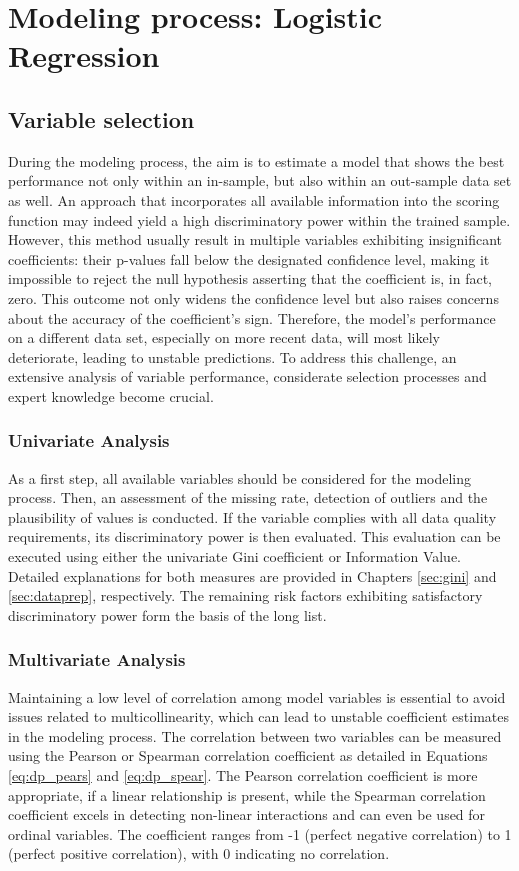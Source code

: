 \section{Modeling process: Logistic Regression}

\subsection{Variable selection}
During the modeling process, the aim is to estimate a model that shows the best performance not only within an in-sample, but also within an out-sample data set as well. An approach that incorporates all available information into the scoring function may indeed yield a high discriminatory power within the trained sample. However, this method usually result in multiple variables exhibiting insignificant coefficients: their p-values fall below the designated confidence level, making it impossible to reject the null hypothesis asserting that the coefficient is, in fact, zero. This outcome not only widens the confidence level but also raises concerns about the accuracy of the coefficient's sign. Therefore, the model's performance on a different data set, especially on more recent data, will most likely deteriorate, leading to unstable predictions. To address this challenge, an extensive analysis of variable performance, considerate selection processes and expert knowledge become crucial. \cite[p.~44]{Witzany:2017}

\subsubsection{Univariate Analysis}
As a first step, all available variables should be considered for the modeling process. Then, an assessment of the missing rate, detection of outliers and the plausibility of values is conducted. If the variable complies with all data quality requirements, its discriminatory power is then evaluated. This evaluation can be executed using either the univariate Gini coefficient or Information Value. Detailed explanations for both measures are provided in Chapters \ref{sec:gini} and \ref{sec:dataprep}, respectively. The remaining risk factors exhibiting satisfactory discriminatory power form the basis of the long list. 

\subsubsection{Multivariate Analysis}
Maintaining a low level of correlation among model variables is essential to avoid issues related to multicollinearity, which can lead to unstable coefficient estimates in the modeling process. The correlation between two variables can be measured using the Pearson or Spearman correlation coefficient as detailed in Equations \ref{eq:dp_pears} and \ref{eq:dp_spear}. The Pearson correlation coefficient is more appropriate, if a linear relationship is present, while the Spearman correlation coefficient excels in detecting non-linear interactions and can even be used for ordinal variables. The coefficient ranges from -1 (perfect negative correlation) to 1 (perfect positive correlation), with 0 indicating no correlation. \cite[p.~129-131]{FUMS:2020} 

